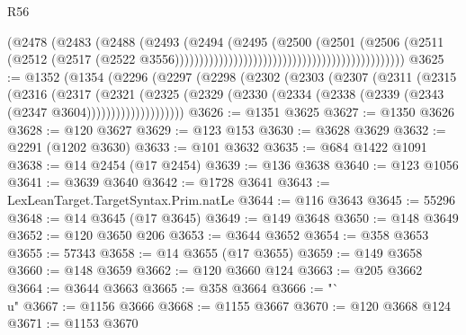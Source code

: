 \begin{lexlean}{R56}
\begin{coremodule}
                                                                        (@2478
                                                                          (@2483
                                                                            (@2488
                                                                              (@2493
                                                                                (@2494
                                                                                  (@2495
                                                                                    (@2500
                                                                                      (@2501
                                                                                        (@2506
                                                                                          (@2511
                                                                                            (@2512
                                                                                              (@2517
                                                                                                (@2522
                                                                                                  @3556)))))))))))))))))))))))))))))))))))))))))))))))
@3625 := @1352
    (@1354
      (@2296
        (@2297
          (@2298
            (@2302
              (@2303
                (@2307
                  (@2311
                    (@2315
                      (@2316
                        (@2317
                          (@2321
                            (@2325
                              (@2329
                                (@2330 (@2334 (@2338 (@2339 (@2343 (@2347 @3604))))))))))))))))))))
@3626 := @1351 @3625
@3627 := @1350 @3626
@3628 := @120 @3627
@3629 := @123 @153
@3630 := @3628 @3629
@3632 := @2291 (@1202 @3630)
@3633 := @101 @3632
@3635 := @684 @1422 @1091
@3638 := @14 @2454 (@17 @2454)
@3639 := @136 @3638
@3640 := @123 @1056
@3641 := @3639 @3640
@3642 := @1728 @3641
@3643 := LexLeanTarget.TargetSyntax.Prim.natLe
@3644 := @116 @3643
@3645 := 55296
@3648 := @14 @3645 (@17 @3645)
@3649 := @149 @3648
@3650 := @148 @3649
@3652 := @120 @3650 @206
@3653 := @3644 @3652
@3654 := @358 @3653
@3655 := 57343
@3658 := @14 @3655 (@17 @3655)
@3659 := @149 @3658
@3660 := @148 @3659
@3662 := @120 @3660 @124
@3663 := @205 @3662
@3664 := @3644 @3663
@3665 := @358 @3664
@3666 := "`\\u"
@3667 := @1156 @3666
@3668 := @1155 @3667
@3670 := @120 @3668 @124
@3671 := @1153 @3670

\end{coremodule}
\end{lexlean}
